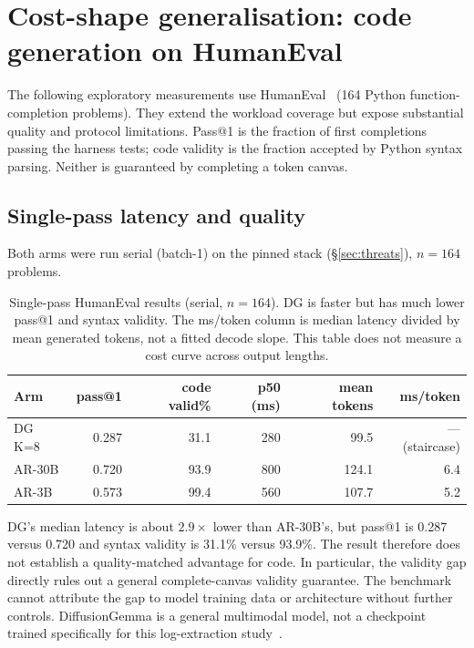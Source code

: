 \section{Cost-shape generalisation: code generation on HumanEval}
\label{app:humaneval}

The following exploratory measurements use HumanEval~\cite{humaneval}
(164 Python function-completion problems). They extend the workload
coverage but expose substantial quality and protocol limitations. Pass@1
is the fraction of first completions passing the harness tests; code
validity is the fraction accepted by Python syntax parsing. Neither is
guaranteed by completing a token canvas.

\subsection{Single-pass latency and quality}

Both arms were run serial (batch-1) on the pinned stack
(\S\ref{sec:threats}), $n{=}164$ problems.

\begin{table}[ht]
\centering
\caption{Single-pass HumanEval results (serial, $n{=}164$). DG is
faster but has much lower pass@1 and syntax validity. The ms/token column
is median latency divided by mean generated tokens, not a fitted decode
slope. This table does not measure a cost curve across output lengths.}
\label{tab:humaneval}
\begin{tabular}{@{}lrrrrr@{}}
\toprule
Arm & pass@1 & code valid\% & p50 (ms) & mean tokens & ms/token \\
\midrule
DG K=8  & 0.287 & 31.1 & 280 & 99.5  & --- (staircase) \\
AR-30B  & 0.720 & 93.9 & 800 & 124.1 & 6.4 \\
AR-3B   & 0.573 & 99.4 & 560 & 107.7 & 5.2 \\
\bottomrule
\end{tabular}
\end{table}

DG's median latency is about $2.9\times$ lower than AR-30B's, but
pass@1 is 0.287 versus 0.720 and syntax validity is 31.1\% versus
93.9\%. The result therefore does not establish a quality-matched
advantage for code. In particular, the validity gap directly rules out
a general complete-canvas validity guarantee. The benchmark cannot
attribute the gap to model training data or architecture without further
controls. DiffusionGemma is a general multimodal model, not a checkpoint
trained specifically for this log-extraction study~\cite{diffusiongemma}.

